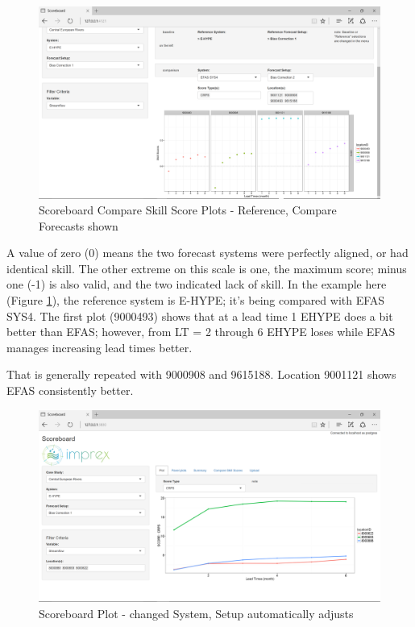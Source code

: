 \documentclass[logos,parttoc,morelanguage=french,morelanguage=german,draft]{orsay-memoire}
\begin{document}
\begin{figure}[H]
\centering
\includegraphics[width=0.85\linewidth]{images/isb5_2.png}
  \caption{Scoreboard Compare Skill Score Plots - Reference, Compare Forecasts shown}
  \label{fig:isb5_2}
\end{figure}

A value of zero (0) means the two forecast systems were perfectly aligned, or had identical skill. The other extreme on this scale is one, the maximum score; minus one (-1) is also valid, and the two indicated lack of skill. In the example here (Figure \ref{fig:isb5_2}), the reference system is E-HYPE; it's being compared with EFAS SYS4. The first plot (9000493) shows that at a lead time 1 EHYPE does a bit better than EFAS; however, from LT = 2 through 6 EHYPE loses while EFAS manages increasing lead times better.

That is generally repeated with 9000908 and 9615188. Location 9001121 shows EFAS consistently better.


\begin{figure}[h]
\centering
\includegraphics[width=0.80\linewidth]{images/isb6.png}
  \caption{Scoreboard Plot - changed System, Setup automatically adjusts}
  \label{fig:isb6}
\end{figure}
\end{document}
